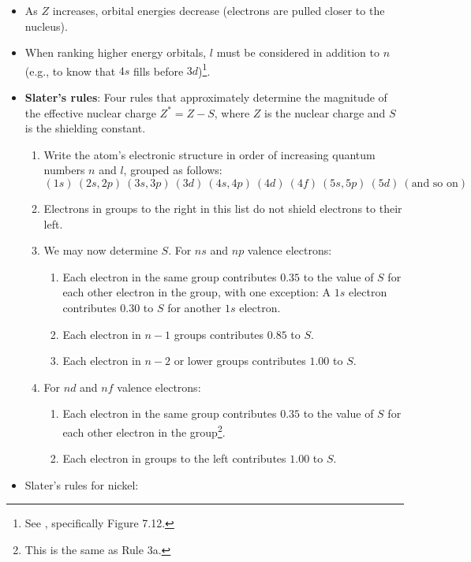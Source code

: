 \documentclass[../notes.tex]{subfiles}
\begin{document}
\begin{itemize}
    \item As $Z$ increases, orbital energies decrease (electrons are pulled closer to the nucleus).
    \item When ranking higher energy orbitals, $l$ must be considered in addition to $n$ (e.g., to know that $4s$ fills before $3d$)\footnote{See \textcite{bib:APChemNotes}, specifically Figure 7.12.}.
    \item \textbf{Slater's rules}: Four rules that approximately determine the magnitude of the effective nuclear charge $Z^*=Z-S$, where $Z$ is the nuclear charge and $S$ is the shielding constant.
    \begin{enumerate}
        \item Write the atom's electronic structure in order of increasing quantum numbers $n$ and $l$, grouped as follows:
        \begin{equation*}
            (1s)\ (2s,2p)\ (3s,3p)\ (3d)\ (4s,4p)\ (4d)\ (4f)\ (5s,5p)\ (5d)\ (\text{and so on})
        \end{equation*}
        \item Electrons in groups to the right in this list do not shield electrons to their left.
        \item We may now determine $S$. For $ns$ and $np$ valence electrons:
        \begin{enumerate}[label={\alph*.}]
            \item Each electron in the same group contributes $0.35$ to the value of $S$ for each other electron in the group, with one exception: A $1s$ electron contributes $0.30$ to $S$ for another $1s$ electron.
            \item Each electron in $n-1$ groups contributes $0.85$ to $S$.
            \item Each electron in $n-2$ or lower groups contributes $1.00$ to $S$.
        \end{enumerate}
        \item For $nd$ and $nf$ valence electrons:
        \begin{enumerate}[label={\alph*.}]
            \item Each electron in the same group contributes $0.35$ to the value of $S$ for each other electron in the group\footnote{This is the same as Rule 3a.}.
            \item Each electron in groups to the left contributes $1.00$ to $S$.
        \end{enumerate}
    \end{enumerate}
    \item Slater's rules for nickel:

\end{itemize}
\end{document}
